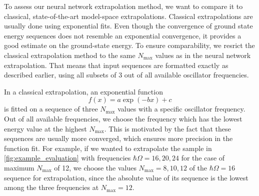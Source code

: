 To assess our neural network extrapolation method, we want to compare it to classical, state-of-the-art model-space extrapolations. Classical extrapolations are usually done using exponential fits. Even though the convergence of ground state energy sequences does not resemble an exponential convergence, it provides a good estimate on the ground-state energy. To ensure comparability, we resrict the classical extrapolation method to the same $N_\mathrm{max}$ values as in the neural network extrapolation. That means that input sequences are formatted exactly as described earlier, using all subsets of 3 out of all available oscillator frequencies.

In a classical extrapolation, an exponential function
\begin{equation}
  f(x) = a \exp(-bx) + c
\end{equation}
is fitted on a sequence of three $N_\mathrm{max}$ values with a specific oscillator frequency. Out of all available frequencies, we choose the frequency which has the lowest energy value at the highest $N_\mathrm{max}$. This is motivated by the fact that these sequences are usually more converged, which ensures more precision in the function fit. For example, if we wanted to extrapolate the sample in \autoref{fig:example_evaluation} with frequencies $\hbar\Omega = 16, 20, 24$ for the case of maximum $N_\mathrm{max}$ of 12, we choose the values  $N_\mathrm{max} = 8, 10, 12$ of the $\hbar\Omega = 16$ sequence for extrapolation, since the absolute value of its sequence is the lowest among the three frequencies at $N_\mathrm{max} = 12$.
